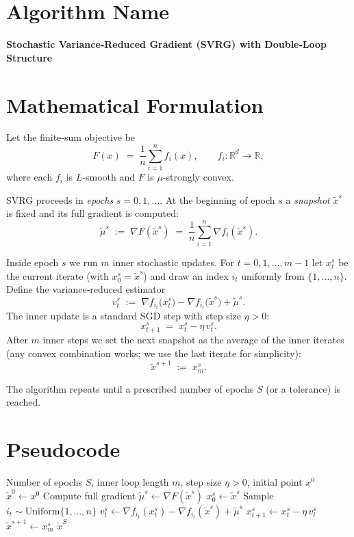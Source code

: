 \documentclass{article}
\newcommand{\R}{\mathbb{R}}
\begin{document}
\section*{Algorithm Name}
\textbf{Stochastic Variance‑Reduced Gradient (SVRG) with Double‑Loop Structure}

\section*{Mathematical Formulation}
Let the finite‑sum objective be  
\[
F(x)\;=\;\frac{1}{n}\sum_{i=1}^{n}f_i(x),\qquad 
f_i:\R^{d}\to\R,
\]
where each $f_i$ is $L$‑smooth and $F$ is $\mu$‑strongly convex.  

SVRG proceeds in \emph{epochs} $s=0,1,\dots$.  
At the beginning of epoch $s$ a \emph{snapshot} $\tilde{x}^{s}$ is fixed and its full gradient is computed:
\[
\tilde{\mu}^{s}\;:=\;\nabla F(\tilde{x}^{s})\;=\;\frac{1}{n}\sum_{i=1}^{n}\nabla f_i(\tilde{x}^{s}).
\]

Inside epoch $s$ we run $m$ inner stochastic updates.  
For $t=0,1,\dots,m-1$ let $x_{t}^{s}$ be the current iterate (with $x_{0}^{s}=\tilde{x}^{s}$) and draw an index $i_t$ uniformly from $\{1,\dots,n\}$.  
Define the variance‑reduced estimator
\[
v_{t}^{s}\;:=\;\nabla f_{i_t}\!\bigl(x_{t}^{s}\bigr)-\nabla f_{i_t}\!\bigl(\tilde{x}^{s}\bigr)+\tilde{\mu}^{s}.
\]
The inner update is a standard SGD step with step size $\eta>0$:
\[
x_{t+1}^{s}\;=\;x_{t}^{s}-\eta\,v_{t}^{s}.
\]
After $m$ inner steps we set the next snapshot as the average of the inner iterates (any convex combination works; we use the last iterate for simplicity):
\[
\tilde{x}^{s+1}\;:=\;x_{m}^{s}.
\]

The algorithm repeats until a prescribed number of epochs $S$ (or a tolerance) is reached.

\section*{Pseudocode}
\begin{algorithm}[H]
\caption{SVRG (double‑loop)}\label{alg:svrg}
\begin{algorithmic}[1]
\Require Number of epochs $S$, inner loop length $m$, step size $\eta>0$, initial point $x^{0}$
\State $\tilde{x}^{0}\gets x^{0}$
    \State Compute full gradient $\tilde{\mu}^{s}\gets \nabla F(\tilde{x}^{s})$ 
    \State $x_{0}^{s}\gets \tilde{x}^{s}$
        \State Sample $i_t\sim\text{Uniform}\{1,\dots,n\}$
        \State $v_{t}^{s}\gets \nabla f_{i_t}(x_{t}^{s})-\nabla f_{i_t}(\tilde{x}^{s})+\tilde{\mu}^{s}$
        \State $x_{t+1}^{s}\gets x_{t}^{s}-\eta\,v_{t}^{s}$ 
    \EndFor
    \State $\tilde{x}^{s+1}\gets x_{m}^{s}$ 
\EndFor
\State \Return $\tilde{x}^{S}$
\end{algorithmic}
\end{algorithm}
\end{document}
